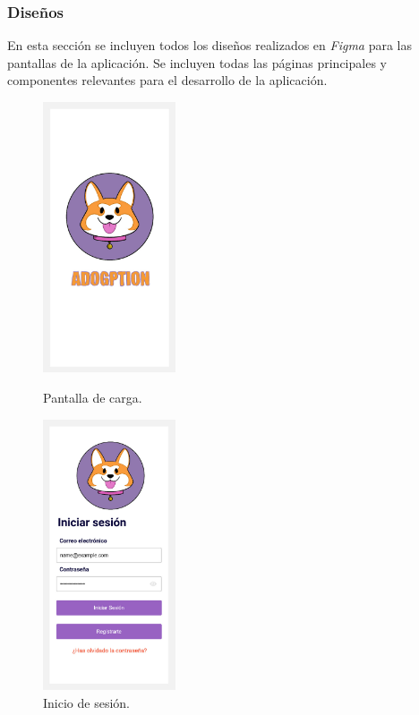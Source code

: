 \documentclass[a4paper, 12pt]{article}
\begin{document}
\newpage
\subsubsection{Diseños}

En esta sección se incluyen todos los diseños realizados en \textit{Figma} para las pantallas de la aplicación. Se incluyen todas las páginas principales y componentes relevantes para el desarrollo de la aplicación.


\begin{figure}[H]
   	\begin{minipage}{0.48\textwidth}
		\begin{center}
			{\includegraphics[height=8cm]{SplashScreen.jpg}\par}
			\caption{Pantalla de carga.}
			\medskip
		\end{center}  
	\end{minipage}\hfill
   	\begin{minipage}{0.48\textwidth}
		\begin{center}
			{\includegraphics[height=8cm]{Login.jpg}\par}
			\caption{Inicio de sesión.}
			\medskip
		\end{center}  
	\end{minipage}\hfill
\end{figure}
\end{document}
